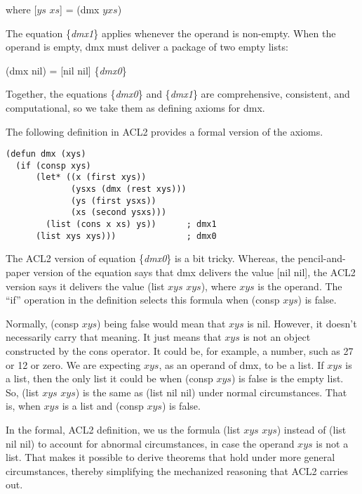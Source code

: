 \hspace{1.4cm} where [$ys$ $xs$] = (dmx $yxs$)

The equation \{\emph{dmx1}\} applies whenever the operand is non-empty.
When the operand is empty, dmx must deliver a package of two empty lists:

\hspace{1cm} (dmx nil) = [nil nil] \hfill \{\emph{dmx0}\}

Together, the equations \{\emph{dmx0}\} and \{\emph{dmx1}\}
are comprehensive, consistent, and computational, so we
take them as defining axioms for dmx.

The following definition in ACL2 provides a formal version of the axioms.

\label{defun:dmx}
\begin{Verbatim}
(defun dmx (xys)
  (if (consp xys)
      (let* ((x (first xys))
             (ysxs (dmx (rest xys)))
             (ys (first ysxs))
             (xs (second ysxs)))
        (list (cons x xs) ys))      ; dmx1
      (list xys xys)))              ; dmx0
\end{Verbatim}

\begin{aside}
The ACL2 version of equation \{\emph{dmx0}\} is a bit tricky.
Whereas, the pencil-and-paper version of the equation
says that dmx delivers the value [nil nil],
the ACL2 version says it delivers the value (list $xys$ $xys$),
where $xys$ is the operand.
The ``if'' operation in the definition selects this formula
when (consp $xys$) is false.

Normally, (consp $xys$) being false would mean that $xys$ is nil.
However, it doesn't
necessarily carry that meaning.
It just means that $xys$ is not an object constructed by
the cons operator.
It could be, for example, a number, such as 27 or 12 or zero.
We are expecting $xys$, as an operand of dmx, to be a list.
If $xys$ is a list,
then the only list it could be when (consp $xys$) is false
is the empty list. So, (list $xys$ $xys$) is the same
as (list nil nil) under normal circumstances.
That is, when $xys$ is a list and (consp $xys$) is false.

In the formal, ACL2 definition,
we us the formula (list $xys$ $xys$) instead of (list nil nil)
to account for abnormal circumstances, in case the operand $xys$
is not a list. That makes it possible to derive theorems that
hold under more general circumstances, thereby simplifying the
mechanized reasoning that ACL2 carries out.
\label{aside:dmx-defun-trick}
\end{aside}

